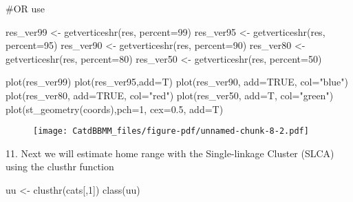 \documentclass[
  letterpaper,
]{book}
\newenvironment{Shaded}{\begin{snugshade}}{\end{snugshade}}
\newcommand{\AttributeTok}[1]{\textcolor[rgb]{0.40,0.45,0.13}{#1}}
\newcommand{\CommentTok}[1]{\textcolor[rgb]{0.37,0.37,0.37}{#1}}
\newcommand{\ConstantTok}[1]{\textcolor[rgb]{0.56,0.35,0.01}{#1}}
\newcommand{\DecValTok}[1]{\textcolor[rgb]{0.68,0.00,0.00}{#1}}
\newcommand{\FloatTok}[1]{\textcolor[rgb]{0.68,0.00,0.00}{#1}}
\newcommand{\FunctionTok}[1]{\textcolor[rgb]{0.28,0.35,0.67}{#1}}
\newcommand{\NormalTok}[1]{\textcolor[rgb]{0.00,0.23,0.31}{#1}}
\newcommand{\OtherTok}[1]{\textcolor[rgb]{0.00,0.23,0.31}{#1}}
\newcommand{\StringTok}[1]{\textcolor[rgb]{0.13,0.47,0.30}{#1}}
\begin{document}
\begin{Shaded}
\begin{Highlighting}[]
\CommentTok{\#OR use}

\NormalTok{res\_ver99 }\OtherTok{\textless{}{-}} \FunctionTok{getverticeshr}\NormalTok{(res, }\AttributeTok{percent=}\DecValTok{99}\NormalTok{)}
\NormalTok{res\_ver95 }\OtherTok{\textless{}{-}} \FunctionTok{getverticeshr}\NormalTok{(res, }\AttributeTok{percent=}\DecValTok{95}\NormalTok{)}
\NormalTok{res\_ver90 }\OtherTok{\textless{}{-}} \FunctionTok{getverticeshr}\NormalTok{(res, }\AttributeTok{percent=}\DecValTok{90}\NormalTok{)}
\NormalTok{res\_ver80 }\OtherTok{\textless{}{-}} \FunctionTok{getverticeshr}\NormalTok{(res, }\AttributeTok{percent=}\DecValTok{80}\NormalTok{)}
\NormalTok{res\_ver50 }\OtherTok{\textless{}{-}} \FunctionTok{getverticeshr}\NormalTok{(res, }\AttributeTok{percent=}\DecValTok{50}\NormalTok{)}

\FunctionTok{plot}\NormalTok{(res\_ver99)}
\FunctionTok{plot}\NormalTok{(res\_ver95,}\AttributeTok{add=}\NormalTok{T)}
\FunctionTok{plot}\NormalTok{(res\_ver90, }\AttributeTok{add=}\ConstantTok{TRUE}\NormalTok{, }\AttributeTok{col=}\StringTok{"blue"}\NormalTok{)}
\FunctionTok{plot}\NormalTok{(res\_ver80, }\AttributeTok{add=}\ConstantTok{TRUE}\NormalTok{, }\AttributeTok{col=}\StringTok{"red"}\NormalTok{)}
\FunctionTok{plot}\NormalTok{(res\_ver50, }\AttributeTok{add=}\NormalTok{T, }\AttributeTok{col=}\StringTok{"green"}\NormalTok{)}
\FunctionTok{plot}\NormalTok{(}\FunctionTok{st\_geometry}\NormalTok{(coords),}\AttributeTok{pch=}\DecValTok{1}\NormalTok{, }\AttributeTok{cex=}\FloatTok{0.5}\NormalTok{, }\AttributeTok{add=}\NormalTok{T)}
\end{Highlighting}
\end{Shaded}

\begin{figure}[H]

{\centering \texttt{[image: CatdBBMM\_files/figure-pdf/unnamed-chunk-8-2.pdf]}

}

\end{figure}

11. Next we will estimate home range with the Single-linkage Cluster
(SLCA) using the clusthr function

\begin{Shaded}
\begin{Highlighting}[]
\NormalTok{uu }\OtherTok{\textless{}{-}} \FunctionTok{clusthr}\NormalTok{(cats[,}\DecValTok{1}\NormalTok{])}
\FunctionTok{class}\NormalTok{(uu)}
\end{Highlighting}
\end{Shaded}
\end{document}
